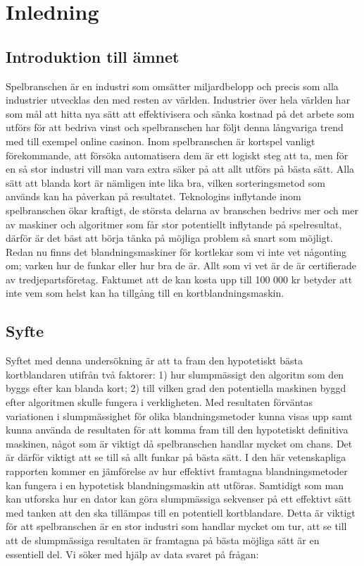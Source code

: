 \documentclass[swedish,a4paper]{article}
\begin{document}
\tableofcontents
\newpage

\section{Inledning}
\subsection{Introduktion till ämnet}

Spelbranschen är en industri som omsätter miljardbelopp och precis som alla
industrier utvecklas den med resten av världen. Industrier över hela världen har
som mål att hitta nya sätt att effektivisera och sänka kostnad på det arbete som
utförs för att bedriva vinst och spelbranschen har följt denna långvariga trend
med till exempel online casinon. Inom spelbranschen är kortspel vanligt
förekommande, att försöka automatisera dem är ett logiskt steg att ta, men för
en så stor industri vill man vara extra säker på att allt utförs på bästa sätt.
Alla sätt att blanda kort är nämligen inte lika bra, vilken sorteringsmetod som
används kan ha påverkan på resultatet. Teknologins inflytande inom spelbranschen
ökar kraftigt, de största delarna av branschen bedrivs mer och mer av maskiner
och algoritmer som får stor potentiellt inflytande på spelresultat, därför är
det bäst att börja tänka på möjliga problem så snart som möjligt. Redan nu finns
det blandningsmaskiner för kortlekar som vi inte vet någonting om; varken hur de
funkar eller hur bra de är. Allt som vi vet är de är certifierade av
tredjepartsföretag. Faktumet att de kan kosta upp till 100 000 kr betyder att
inte vem som helst kan ha tillgång till en kortblandningsmaskin.

\subsection{Syfte}

Syftet med denna undersökning är att ta fram den hypotetiskt bästa kortblandaren
utifrån två faktorer: 1) hur slumpmässigt den algoritm som den byggs efter kan
blanda kort; 2) till vilken grad den potentiella maskinen byggd efter algoritmen
skulle fungera i verkligheten. Med resultaten förväntas variationen i
slumpmässighet för olika blandningsmetoder kunna visas upp samt kunna använda de
resultaten för att komma fram till den hypotetiskt definitiva maskinen, något
som är viktigt då spelbranschen handlar mycket om chans. Det är därför viktigt
att se till så allt funkar på bästa sätt. I den här vetenskapliga rapporten
kommer en jämförelse av hur effektivt framtagna blandningsmetoder kan fungera i
en hypotetisk blandningsmaskin att utföras. Samtidigt som man kan utforska hur
en dator kan göra slumpmässiga sekvenser på ett effektivt sätt med tanken att
den ska tillämpas till en potentiell kortblandare. Detta är viktigt för att
spelbranschen är en stor industri som handlar mycket om tur, att se till att de
slumpmässiga resultaten är framtagna på bästa möjliga sätt är en essentiell del.
Vi söker med hjälp av data svaret på frågan:
\end{document}

